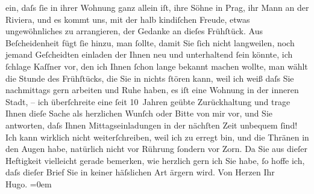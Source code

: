 \begin{ledgroupsized}[t]{13cm}
               ein, daſs ſie in ihrer Wohnung {\pb}ganz allein iſt, ihre Söhne in Prag, ihr Mann an der Riviera, und es kommt uns, mit der halb
               kindiſchen Freude, etwas ungewöhnliches zu arrangieren, der Gedanke an dieſes
               Frühſtück. Aus Beſcheidenheit fügt ſie hinzu, man ſollte, damit Sie ſich nicht
               langweilen, noch {\pb}jemand
               Geſcheidten einladen der Ihnen neu und unterhaltend ſein könnte, ich ſchlage Kaſſner vor, den ich Ihnen ſchon lange bekannt
               machen wollte, man wählt die Stunde des Frühſtücks, die Sie in nichts ſtören kann,
               weil {\pb}ich weiß daſs Sie
               nachmittags gern arbeiten und Ruhe haben, es iſt eine Wohnung in der inneren Stadt,\pend
           \pstart
           \numberlinefalse{}–\numberlinetrue{}\pend
           \pstart
           ich überſchreite eine ſeit 10 Jahren geübte Zurückhaltung und trage Ihnen dieſe Sache
               als herzlichen Wunſch oder Bitte von {\pb}mir vor, und Sie antworten, daſs
               Ihnen Mittagseinladungen in der nächſten Zeit unbequem ſind!\pend
           \pstart
           Ich kann wirklich nicht weiterſchreiben, weil ich zu erregt bin, und die Thränen in
               den Augen {\pb}habe, natürlich nicht
               vor Rührung ſondern vor Zorn.\pend
           \pstart
           Da Sie aus dieſer Heftigkeit vielleicht gerade bemerken, wie herzlich gern ich Sie
               habe, ſo hoffe ich, daſs dieſer Brief Sie in keiner häſslichen Art ärgern wird.\pend
           \pstart
           Von Herzen Ihr{\\[\baselineskip]}\spacefill\mbox{Hugo.}\pend
           \leftskip=0em{}
         
         \endnumbering{}\end{ledgroupsized}  \newcommand{\dateiname}{L01210}\newcommand{\titel}{Hugo von Hofmannsthal an Arthur Schnitzler, [28. 3. 1902]}\newcommand{\editorInnen}{Martin Anton Müller und Gerd-Hermann Susen}
      